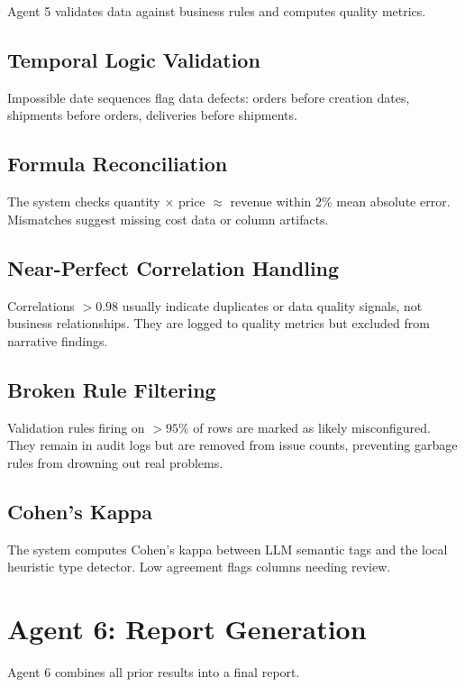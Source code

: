 \documentclass[12pt,a4paper,openany]{report}
\begin{document}
Agent 5 validates data against business rules and computes quality metrics.

\subsection{Temporal Logic Validation}

Impossible date sequences flag data defects: orders before creation dates, shipments before orders, deliveries before shipments.

\subsection{Formula Reconciliation}

The system checks quantity $\times$ price $\approx$ revenue within 2\% mean absolute error. Mismatches suggest missing cost data or column artifacts.

\subsection{Near-Perfect Correlation Handling}

Correlations $> 0.98$ usually indicate duplicates or data quality signals, not business relationships. They are logged to quality metrics but excluded from narrative findings.

\subsection{Broken Rule Filtering}

Validation rules firing on $>95\%$ of rows are marked as likely misconfigured. They remain in audit logs but are removed from issue counts, preventing garbage rules from drowning out real problems.

\subsection{Cohen's Kappa}

The system computes Cohen's kappa between LLM semantic tags and the local heuristic type detector. Low agreement flags columns needing review.

\section{Agent 6: Report Generation}

Agent 6 combines all prior results into a final report.
\end{document}
